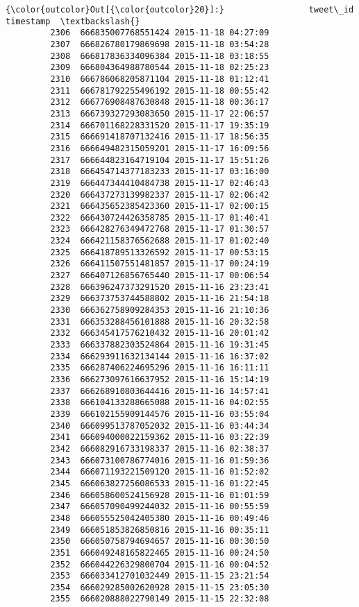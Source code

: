 \documentclass[11pt]{article}
\begin{document}
\begin{Verbatim}[commandchars=\\\{\}]
{\color{outcolor}Out[{\color{outcolor}20}]:}                 tweet\_id           timestamp  \textbackslash{}
         2306  666835007768551424 2015-11-18 04:27:09   
         2307  666826780179869698 2015-11-18 03:54:28   
         2308  666817836334096384 2015-11-18 03:18:55   
         2309  666804364988780544 2015-11-18 02:25:23   
         2310  666786068205871104 2015-11-18 01:12:41   
         2311  666781792255496192 2015-11-18 00:55:42   
         2312  666776908487630848 2015-11-18 00:36:17   
         2313  666739327293083650 2015-11-17 22:06:57   
         2314  666701168228331520 2015-11-17 19:35:19   
         2315  666691418707132416 2015-11-17 18:56:35   
         2316  666649482315059201 2015-11-17 16:09:56   
         2317  666644823164719104 2015-11-17 15:51:26   
         2318  666454714377183233 2015-11-17 03:16:00   
         2319  666447344410484738 2015-11-17 02:46:43   
         2320  666437273139982337 2015-11-17 02:06:42   
         2321  666435652385423360 2015-11-17 02:00:15   
         2322  666430724426358785 2015-11-17 01:40:41   
         2323  666428276349472768 2015-11-17 01:30:57   
         2324  666421158376562688 2015-11-17 01:02:40   
         2325  666418789513326592 2015-11-17 00:53:15   
         2326  666411507551481857 2015-11-17 00:24:19   
         2327  666407126856765440 2015-11-17 00:06:54   
         2328  666396247373291520 2015-11-16 23:23:41   
         2329  666373753744588802 2015-11-16 21:54:18   
         2330  666362758909284353 2015-11-16 21:10:36   
         2331  666353288456101888 2015-11-16 20:32:58   
         2332  666345417576210432 2015-11-16 20:01:42   
         2333  666337882303524864 2015-11-16 19:31:45   
         2334  666293911632134144 2015-11-16 16:37:02   
         2335  666287406224695296 2015-11-16 16:11:11   
         2336  666273097616637952 2015-11-16 15:14:19   
         2337  666268910803644416 2015-11-16 14:57:41   
         2338  666104133288665088 2015-11-16 04:02:55   
         2339  666102155909144576 2015-11-16 03:55:04   
         2340  666099513787052032 2015-11-16 03:44:34   
         2341  666094000022159362 2015-11-16 03:22:39   
         2342  666082916733198337 2015-11-16 02:38:37   
         2343  666073100786774016 2015-11-16 01:59:36   
         2344  666071193221509120 2015-11-16 01:52:02   
         2345  666063827256086533 2015-11-16 01:22:45   
         2346  666058600524156928 2015-11-16 01:01:59   
         2347  666057090499244032 2015-11-16 00:55:59   
         2348  666055525042405380 2015-11-16 00:49:46   
         2349  666051853826850816 2015-11-16 00:35:11   
         2350  666050758794694657 2015-11-16 00:30:50   
         2351  666049248165822465 2015-11-16 00:24:50   
         2352  666044226329800704 2015-11-16 00:04:52   
         2353  666033412701032449 2015-11-15 23:21:54   
         2354  666029285002620928 2015-11-15 23:05:30   
         2355  666020888022790149 2015-11-15 22:32:08   
         

\end{Verbatim}
\end{document}
